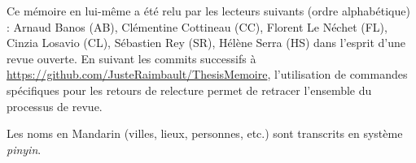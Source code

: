 Ce mémoire en lui-même a été relu par les lecteurs suivants (ordre alphabétique) : Arnaud Banos (AB), Clémentine Cottineau (CC), Florent Le Néchet (FL), Cinzia Losavio (CL), Sébastien Rey (SR), Hélène Serra (HS) dans l'esprit d'une revue ouverte. En suivant les commits successifs à \url{https://github.com/JusteRaimbault/ThesisMemoire}, l'utilisation de commandes spécifiques pour les retours de relecture permet de retracer l'ensemble du processus de revue.

Les noms en Mandarin (villes, lieux, personnes, etc.) sont transcrits en système \emph{pinyin}.




\endgroup			

\vfill









